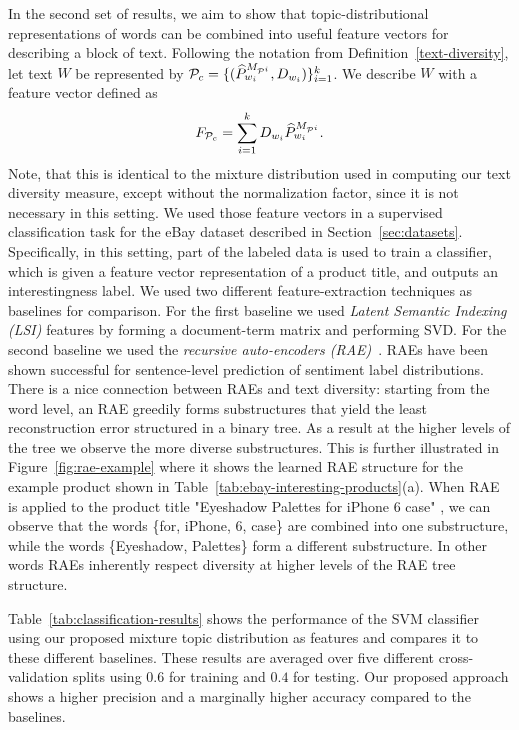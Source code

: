 In the second set of results, we aim to show that topic-distributional
representations of words can be combined into useful feature vectors
for describing a block of text. Following the notation from
Definition~\ref{text-diversity}, let text $W$ be represented by 
${\mathcal P}_c=\{(\widehat{P}^{M_{{\mathcal P}^i}}_{w_i},D_{w_i})\}_{i=1}^k$. We
describe $W$ with a feature vector defined as
\[F_{{\mathcal P}_c}=\sum_{i=1}^k D_{w_i}\widehat{P}^{M_{{\mathcal P}^i}}_{w_i}.\] Note, that this is identical to
the mixture distribution used in computing our text diversity measure, except
without the normalization factor, since it is not necessary in this setting.
We used those feature vectors in a supervised classification
task for the eBay dataset described in
Section~\ref{sec:datasets}. Specifically, in this setting, part of the labeled data
is used to train a classifier, which is given a feature vector
representation of a product title, and outputs an interestingness
label. We used two 
different feature-extraction techniques as baselines for
comparison. For the first baseline we used {\em Latent Semantic
  Indexing (LSI)} features by forming a 
document-term matrix and performing SVD. For the second baseline we used the {\em recursive auto-encoders (RAE)}~\cite{Socher:2011:SRA:2145432.2145450}. RAEs 
have been shown successful for sentence-level prediction of sentiment label
distributions. There is a nice connection between RAEs and text diversity: starting from the word level, an RAE greedily forms substructures that yield the least reconstruction error  structured in a  binary tree. As a result at the higher levels of the tree we observe the more diverse  substructures. This is further illustrated in Figure~\ref{fig:rae-example} where it shows the learned RAE structure for the example product shown in Table~\ref{tab:ebay-interesting-products}(a). When RAE is applied to the product title "Eyeshadow Palettes for iPhone 6 case" , we can observe that the words \{for, iPhone, 6, case\} are combined into one substructure, while the words \{Eyeshadow, Palettes\} form a different substructure. In other words RAEs inherently respect diversity at higher levels of the RAE tree structure.

Table~\ref{tab:classification-results} shows
the performance of the SVM classifier using our proposed mixture topic
distribution as features and compares it to these different baselines.
These results are averaged over five different cross-validation splits using $0.6$ for training
and $0.4$ for testing. Our proposed approach shows a higher precision
and a marginally higher accuracy compared to the baselines.
